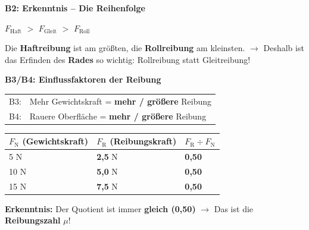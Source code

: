 \documentclass[11pt,a4paper]{article}
\newcommand{\aufgabe}[1]{\noindent\textbf{\textcolor{fachfarbe}{#1}}}
\newcommand{\lsg}[1]{\textcolor{loesung}{\textbf{#1}}}
\begin{document}
\vspace{0.2em}

\aufgabe{B2: Erkenntnis -- Die Reihenfolge}

\vspace{0.2em}
\begin{center}
{\large $F_{\text{Haft}}$ \lsg{$>$} $F_{\text{Gleit}}$ \lsg{$>$} $F_{\text{Roll}}$}
\end{center}

\vspace{0.1em}
\begin{merkebox}[title=K2: Merksatz -- Die drei Reibungsarten]
\small
Die \lsg{Haftreibung} ist am größten, die \lsg{Rollreibung} am kleinsten.
$\rightarrow$ Deshalb ist das Erfinden des \lsg{Rades} so wichtig: Rollreibung statt Gleitreibung!
\end{merkebox}

\vspace{0.2em}

\aufgabe{B3/B4: Einflussfaktoren der Reibung}

\vspace{0.2em}
\begin{tabular}{ll}
B3: & Mehr Gewichtskraft = \lsg{mehr / größere} Reibung \\[0.3em]
B4: & Rauere Oberfläche = \lsg{mehr / größere} Reibung \\
\end{tabular}

\vspace{0.2em}

\begin{protokollbox}[title=K4: Messwerte -- Reibungskraft bei verschiedenen Gewichten]
\small
\renewcommand{\arraystretch}{1.3}
\begin{tabular}{|p{3.5cm}|p{3.5cm}|p{3.5cm}|}
\hline
\textbf{$F_\text{N}$ (Gewichtskraft)} & \textbf{$F_\text{R}$ (Reibungskraft)} & \textbf{$F_\text{R} \div F_\text{N}$} \\
\hline
5 N & \lsg{2,5} N & \lsg{0,50} \\
\hline
10 N & \lsg{5,0} N & \lsg{0,50} \\
\hline
15 N & \lsg{7,5} N & \lsg{0,50} \\
\hline
\end{tabular}

\vspace{0.2em}
\textbf{Erkenntnis:} Der Quotient ist immer \lsg{gleich (0,50)} $\rightarrow$ Das ist die \textbf{Reibungszahl} $\mu$!
\end{protokollbox}
\end{document}
